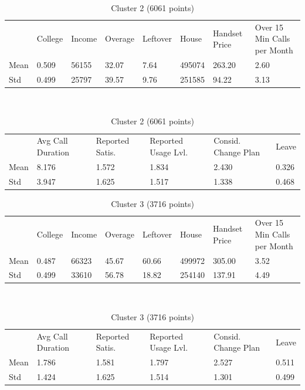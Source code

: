 \documentclass[12pt, notitlepage]{article}
\begin{document}
\begin{table}[H]
	\centering
	\caption{Cluster 2 (6061 points)}
	\begin{tabular}{|l|l|l|l|l|l|l|l|}
		\cline{1-8}
		& College & Income & Overage & Leftover & House   & Handset Price & Over 15 Min Calls per Month \\
		\cline{1-8}
		Mean & 0.509  & 56155   & 32.07 &    7.64 & 495074 &  263.20 &    2.60\\
		\cline{1-8}
		Std  & 0.499 &  25797  &  39.57  &   9.76  &251585   & 94.22  &   3.13 \\
		\cline{1-8}
	\end{tabular}\\
	\begin{tabular}{|l|l|l|l|l|l|}
		\cline{1-6}
		& Avg Call Duration & Reported Satis. & Reported Usage Lvl. & Consid. Change Plan & Leave\\
		\cline{1-6}
		Mean & 8.176  &   1.572  &   1.834    & 2.430   &  0.326\\
		\cline{1-6}
		Std & 3.947 & 1.625 &  1.517  &   1.338   &  0.468\\
		\cline{1-6}
	\end{tabular}
\end{table}
\begin{table}[H]
	\centering
	\caption{Cluster 3 (3716 points)}
	\begin{tabular}{|l|l|l|l|l|l|l|l|}
		\cline{1-8}
		& College & Income & Overage & Leftover & House   & Handset Price & Over 15 Min Calls per Month \\
		\cline{1-8}
		Mean & 0.487 &  66323  &  45.67  &  60.66 &499972  & 305.00 &    3.52\\
		\cline{1-8}
		Std  &0.499  & 33610  &  56.78  &  18.82 & 254140 &  137.91  &   4.49 \\
		\cline{1-8}
	\end{tabular}\\
	\begin{tabular}{|l|l|l|l|l|l|}
		\cline{1-6}
		& Avg Call Duration & Reported Satis. & Reported Usage Lvl. & Consid. Change Plan & Leave\\
		\cline{1-6}
		Mean & 1.786  &   1.581  &   1.797   &  2.527   &  0.511\\
		\cline{1-6}
		Std & 1.424 & 1.625  &1.514 &  1.301 & 0.499\\
		\cline{1-6}
	\end{tabular}
\end{table}
\end{document}
